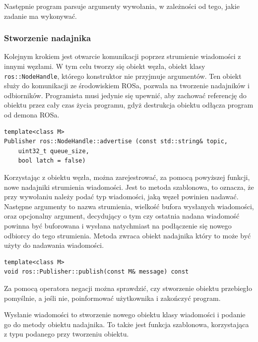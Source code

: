 			Następnie program parsuje argumenty wywołania, w zależności od tego, jakie zadanie ma wykonywać.
			
		\subsubsection{Stworzenie nadajnika}
			Kolejnym krokiem jest otwarcie komunikacji poprzez strumienie wiadomości z innymi węzłami.
			W tym celu tworzy się obiekt węzła, obiekt klasy \texttt{ros::NodeHandle}, którego konstruktor nie przyjmuje argumentów.
			Ten obiekt służy do komunikacji ze środowiskiem ROSa, pozwala na tworzenie nadajników i odbiorników.
			Programista musi jedynie się upewnić, aby zachować referencję do obiektu przez cały czas życia programu, gdyż destrukcja obiektu odłącza 
			program od demona ROSa.
			\begin{verbatim}
template<class M>
Publisher ros::NodeHandle::advertise (const std::string& topic,
	uint32_t queue_size,
	bool latch = false)	
			\end{verbatim}
			Korzystając z obiektu węzła, można zarejestrować, za pomocą powyższej funkcji, nowe nadajniki strumienia wiadomości.
			Jest to metoda szablonowa, to oznacza, że przy wywołaniu należy podać typ wiadomości, jaką węzeł powinien nadawać.
			Następne argumenty to nazwa strumienia, wielkość bufora wysłanych wiadomości, oraz opcjonalny argument, decydujący o tym czy ostatnia nadana wiadomość powinna
			być buforowana i wysłana natychmiast na podłączenie się nowego odbiorcy do tego strumienia. Metoda zwraca obiekt nadajnika który to może być użyty do nadawania wiadomości.
			\begin{verbatim}
template<class M>
void ros::Publisher::publish(const M& message) const
			\end{verbatim}		
			Za pomocą operatora negacji można sprawdzić, czy stworzenie obiektu przebiegło pomyślnie, a jeśli nie, poinformować użytkownika i zakończyć program.
			
			Wysłanie wiadomości to stworzenie nowego obiektu klasy wiadomości i podanie go do metody obiektu nadajnika.
			To także jest funkcja szablonowa, korzystająca z typu podanego przy tworzeniu obiektu.
			
